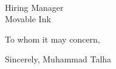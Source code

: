 \documentclass[10pt,letter]{letter}
\def\name{Muhammad Talha} %
\def\hm{} %
\def\company{Movable Ink} %
\def \closing{Sincerely, \name}
\begin{document}


\begin{letter}{\hm \\ Hiring Manager \\ \company }

\opening{To whom it may concern,}




 

\closing{}
\end{letter}
\end{document}
